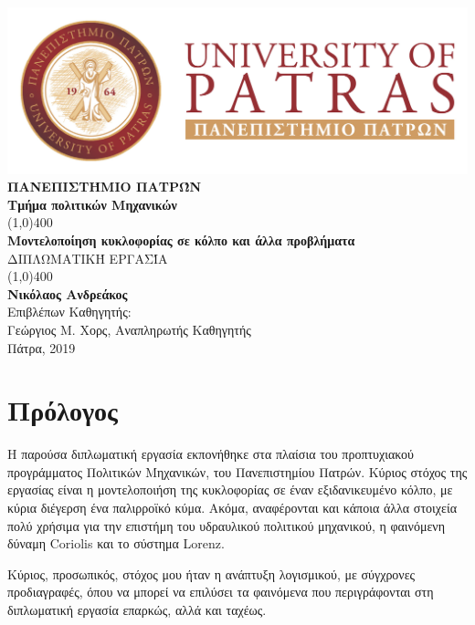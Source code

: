 \documentclass[12pt, a4paper, oneside]{article}
\numberwithin{equation}{subsection}
\def\lat#1{\textlatin{#1}}
\newcommand{\theauthor}{Νικόλαος Ανδρεάκος\xspace}
\newcommand{\thetitle}{Μοντελοποίηση κυκλοφορίας σε κόλπο και άλλα προβλήματα\xspace}
\newcommand{\thedate}{Πάτρα, 2019\xspace}
\newcommand{\tmima}{Τμήμα πολιτικών Μηχανικών\xspace}
\newcommand{\proff}{Γεώργιος Μ. Χορς\xspace}
\newcommand{\proffrole}{Αναπληρωτής Καθηγητής\xspace}
\newenvironment{ComputerFont}{\fontfamily{cmr}\selectfont}{\par}
\begin{document}
	\sloppy
	\begin{ComputerFont}
		\begin{titlepage}
			\begin{center}
				\includegraphics[scale=0.4]{logo_pp}\\
				\Large{\MakeUppercase{\textbf{Πανεπιστήμιο Πατρών}}}\\
				\Large{\textbf{\tmima}}\\
				\vfill
				\line(1,0){400}\\[1mm]
				\huge{{\textbf{\thetitle}}}\\[3mm]
				\Large{\MakeUppercase{{Διπλωματική Εργασία}}}\\[1mm]
				\line(1,0){400}\\
				\vfill
				\textbf{\Large{\theauthor}}\\[2mm]
				Επιβλέπων Καθηγητής:\\
				\proff, \proffrole \\
				\vfill
				\thedate \\
			\end{center}
		\end{titlepage}
	\end{ComputerFont}

	\section*{Πρόλογος}
		\thispagestyle{pagenum}
		Η παρούσα διπλωματική εργασία εκπονήθηκε στα πλαίσια του προπτυχιακού προγράμματος Πολιτικών Μηχανικών, του Πανεπιστημίου Πατρών. Κύριος στόχος της εργασίας είναι η μοντελοποιήση της κυκλοφορίας σε έναν εξιδανικευμένο κόλπο, με κύρια διέγερση ένα παλιρροϊκό κύμα. Ακόμα, αναφέρονται και κάποια άλλα στοιχεία πολύ χρήσιμα για την επιστήμη του υδραυλικού πολιτικού μηχανικού, η φαινόμενη δύναμη \lat{Coriolis} και το σύστημα \lat{Lorenz}.

		Κύριος, προσωπικός, στόχος μου ήταν η ανάπτυξη λογισμικού, με σύγχρονες προδιαγραφές, όπου να μπορεί να επιλύσει τα φαινόμενα που περιγράφονται στη διπλωματική εργασία επαρκώς, αλλά και ταχέως.
\end{document}

